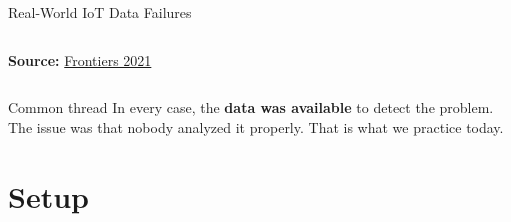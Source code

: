 \documentclass[aspectratio=169,11pt]{beamer}
\begin{document}
\begin{frame}[shrink=8]{Real-World IoT Data Failures}
\begin{columns}
{\begin{minipage}{0.9\textwidth}
            \vspace{0.1cm}
            \textbf{Source:} \href{https://www.frontiersin.org/journals/environmental-science/articles/10.3389/fenvs.2021.719567/full}{Frontiers 2021}
            \vspace{0.1cm}
        \end{minipage}
        }

    \end{columns}

    \vspace{0.15cm}
    \begin{block}{Common thread}
        In every case, the \textbf{data was available} to detect the problem. The issue was that nobody analyzed it properly. That is what we practice today.
    \end{block}
\end{frame}

\section{Setup}
\end{document}
